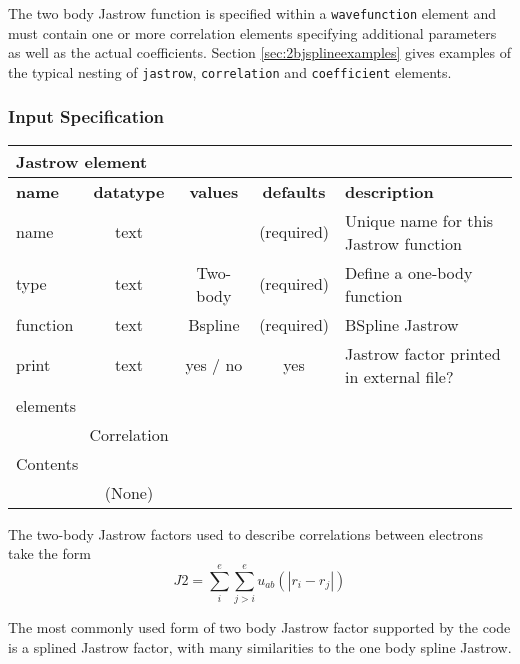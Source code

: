  The two body Jastrow function is specified within a \texttt{wavefunction} element
and must contain one or more correlation elements specifying additional parameters
as well as the actual coefficients.  Section \ref{sec:2bjsplineexamples} gives 
examples of the typical nesting of \texttt{jastrow}, \texttt{correlation} and
\texttt{coefficient} elements.

\subsubsection{Input Specification}

\begin{table}[h]
\begin{center}
\begin{tabular}{l c c c l }
\hline
\multicolumn{5}{l}{Jastrow element} \\
\hline
\bfseries name & \bfseries datatype & \bfseries values & \bfseries defaults  & \bfseries description \\
\hline
name & text &    & (required) & Unique name for this Jastrow function \\
type & text & Two-body & (required) & Define a one-body function \\ 
function & text & Bspline & (required) & BSpline Jastrow \\
print & text & yes / no & yes & Jastrow factor printed in external file?\\
  \hline
\multicolumn{5}{l}{elements}\\ \hline
& Correlation & & & \\ \hline
\multicolumn{5}{l}{Contents}\\ \hline
& (None)  & & &  \\ \hline
\end{tabular}
\end{center}
\end{table}

The two-body Jastrow factors used to describe correlations between electrons take the form
\begin{equation}
J2=\sum_i^{e}\sum_{j>i}^{e} u_{ab}(|r_i-r_j|)
\end{equation}

The most commonly used form of two body Jastrow factor supported by the code is a splined
Jastrow factor, with many similarities to the one body spline Jastrow.




